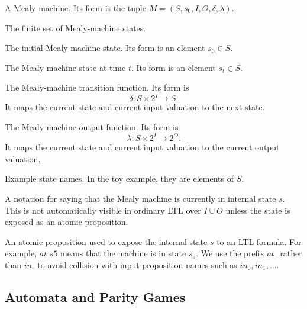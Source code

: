 \documentclass[11pt]{article}
\theoremstyle{remark}
\begin{document}
\begin{description}[leftmargin=2.8cm,style=nextline]
  \item[\(M\)]
  A Mealy machine. Its form is the tuple
  \(M=(S,s_0,I,O,\delta,\lambda)\).

  \item[\(S\)]
  The finite set of Mealy-machine states.

  \item[\(s_0\)]
  The initial Mealy-machine state. Its form is an element \(s_0\in S\).

  \item[\(s_t\)]
  The Mealy-machine state at time \(t\). Its form is an element \(s_t\in S\).

  \item[\(\delta\)]
  The Mealy-machine transition function. Its form is
  \[
    \delta:S\times 2^I\to S.
  \]
  It maps the current state and current input valuation to the next state.

  \item[\(\lambda\)]
  The Mealy-machine output function. Its form is
  \[
    \lambda:S\times 2^I\to 2^O.
  \]
  It maps the current state and current input valuation to the current output
  valuation.

  \item[\(idle,pending\)]
  Example state names. In the toy example, they are elements of \(S\).

  \item[\(state=s\)]
  A notation for saying that the Mealy machine is currently in internal state
  \(s\). This is not automatically visible in ordinary LTL over \(I\cup O\)
  unless the state is exposed as an atomic proposition.

  \item[\(\mathit{at\_s}\)]
  An atomic proposition used to expose the internal state \(s\) to an LTL
  formula. For example, \(\mathit{at\_s5}\) means that the machine is in state
  \(s_5\). We use the prefix \(\mathit{at\_}\) rather than \(\mathit{in\_}\) to
  avoid collision with input proposition names such as \(in_0,in_1,\ldots\).
\end{description}

\subsection*{Automata and Parity Games}
\end{document}
